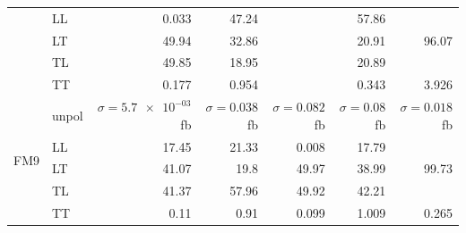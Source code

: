 \begin{table}[h]
{\begin{tabular}{llrrrrr}
 & LL & \num{0.033} & \num{47.24} &  & \num{57.86} &  \\
 & LT & \num{49.94} & \num{32.86} &  & \num{20.91} & \num{96.07} \\
 & TL & \num{49.85} & \num{18.95} &  & \num{20.89} &  \\
 & TT & \num{0.177} & \num{0.954} &  & \num{0.343} & \num{3.926} \\
\midrule
\multirow{5}{*}{FM9}
 & unpol & $\sigma = \num{5.7e-03}$ fb & $\sigma = \num{0.038}$ fb & $\sigma = \num{0.082}$ fb & $\sigma = \num{0.08}$ fb & $\sigma = \num{0.018}$ fb \\
 & LL & \num{17.45} & \num{21.33} & \num{0.008} & \num{17.79} &  \\
 & LT & \num{41.07} & \num{19.8} & \num{49.97} & \num{38.99} & \num{99.73} \\
 & TL & \num{41.37} & \num{57.96} & \num{49.92} & \num{42.21} &  \\
 & TT & \num{0.11} & \num{0.91} & \num{0.099} & \num{1.009} & \num{0.265} \\
\bottomrule
\end{tabular}
}%
\end{table}